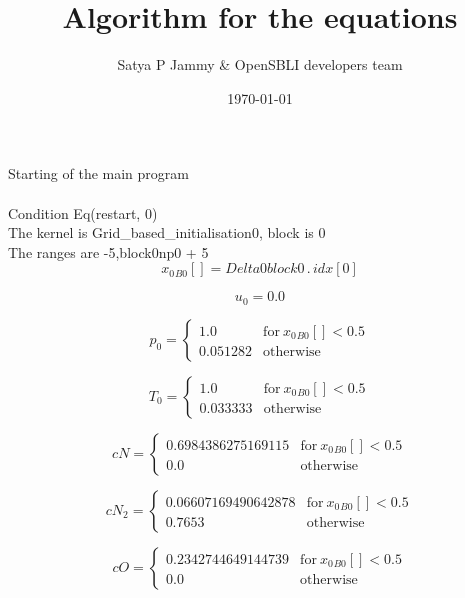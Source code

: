 \documentclass{article}
\title{Algorithm for the equations}
\author{Satya P Jammy \& OpenSBLI developers team}
\date{\today}
\begin{document}
\maketitle
\noindent Starting of the main program\\
\\\noindent Condition Eq(restart, 0)\\\noindent The kernel is Grid_based_initialisation0, block is 0\\\noindent The ranges are -5,block0np0 + 5\\\begin{dmath}{x_{0}{_{B0}}}[{}] = Delta0block0 \,.\, {idx}[{0}]\end{dmath}

\begin{dmath}u_{0} = 0.0\end{dmath}

\begin{dmath}p_{0} = \begin{cases} 1.0 & \text{for}\: {x_{0}{_{B0}}}[{}] < 0.5 \\0.051282 & \text{otherwise} \end{cases}\end{dmath}

\begin{dmath}T_{0} = \begin{cases} 1.0 & \text{for}\: {x_{0}{_{B0}}}[{}] < 0.5 \\0.033333 & \text{otherwise} \end{cases}\end{dmath}

\begin{dmath}cN = \begin{cases} 0.6984386275169115 & \text{for}\: {x_{0}{_{B0}}}[{}] < 0.5 \\0.0 & \text{otherwise} \end{cases}\end{dmath}

\begin{dmath}cN_{2} = \begin{cases} 0.06607169490642878 & \text{for}\: {x_{0}{_{B0}}}[{}] < 0.5 \\0.7653 & \text{otherwise} \end{cases}\end{dmath}

\begin{dmath}cO = \begin{cases} 0.2342744649144739 & \text{for}\: {x_{0}{_{B0}}}[{}] < 0.5 \\0.0 & \text{otherwise} \end{cases}\end{dmath}
\end{document}

